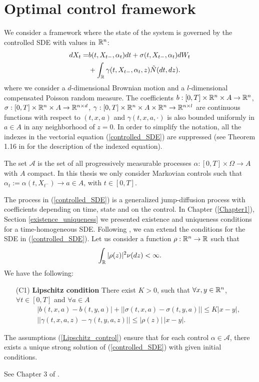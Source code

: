 \section{Optimal control framework}\label{Optimal_control_framework}

We consider a framework where the state of the system is governed by the controlled SDE with values in $\mathbb{R}^n$:
\begin{align}\label{controlled_SDE}
 dX_t =& b(t,X_{t-},\alpha_t) dt + \sigma (t,X_{t-},\alpha_t) dW_t \\ \nonumber
      &+ \int_{\mathbb{R}} \gamma(t,X_{t-},\alpha_t,z) \tilde N(dt,dz).
\end{align}
where we consider a $d$-dimensional Brownian motion and a $l$-dimensional compensated Poisson random measure. 
The coefficients $b: [0,T]\times \mathbb{R}^n \times A \to \mathbb{R}^n$, $\sigma: [0,T]\times \mathbb{R}^n \times A \to \mathbb{R}^{n \times d}$, 
$\gamma: [0,T]\times \mathbb{R}^n \times A \times \mathbb{R}^n \to \mathbb{R}^{n \times l}$ are continuous functions with respect to $(t,x,a)$ and $\gamma(t,x,a,\cdot)$ is also bounded
uniformly in $a \in A$ in any neighborhood of $z=0$. 
In order to simplify the notation, all the indexes in the vectorial equation (\ref{controlled_SDE}) are suppressed 
(see Theorem 1.16 in \cite{OksendalSulem} for the description of the indexed equation).

The set $\mathcal{A}$ is the set of all progressively measurable processes $\alpha: [0,T]\times \Omega \to  A$ with $A$ compact.
In this thesis we only consider Markovian controls such that $\alpha_t := \alpha(t,X_{t^-}) \to a \in A$, with $t\in [0,T]$.

The process in (\ref{controlled_SDE}) is a generalized jump-diffusion process with coefficients depending on time, state and on the control. 
In Chapter (\ref{Chapter1}), Section \ref{existence_uniqueness} we presented existence and uniqueness conditions for a time-homogeneous SDE. Following \cite{Skorohod}, we can extend 
the conditions for the SDE in (\ref{controlled_SDE}).
Let us consider a function $\rho : \mathbb{R}^n \to \mathbb{R} $ such that
\begin{equation}\label{rho}
 \int_{\mathbb{R}} |\rho(z)|^2 \nu(dz) < \infty.
\end{equation}
We have the following:
\begin{itemize}
 \item[(C1)] \textbf{Lipschitz condition} There exist $K >0$, such that $\forall x,y \in \mathbb{R}^n$, $\forall t \in [0,T]$ and $\forall a \in A$
 \begin{align}\label{Lipschitz_control}
  &|b(t,x,a) - b(t,y,a)| + || \sigma(t,x,a) - \sigma(t,y,a) || \leq K |x-y|,\\  
  & ||\gamma(t,x,a,z) - \gamma(t,y,a,z)|| \leq |\rho(z)|\,|x-y|. \label{Lipschitz_control2}
 \end{align}
\end{itemize}
\begin{Theorem}
 The assumptions (\ref{Lipschitz_control}) ensure that for each control $\alpha \in \mathcal{A}$, there exists a unique strong solution of (\ref{controlled_SDE}) with given initial 
 conditions.
\end{Theorem}
See Chapter 3 of \cite{Skorohod}.

